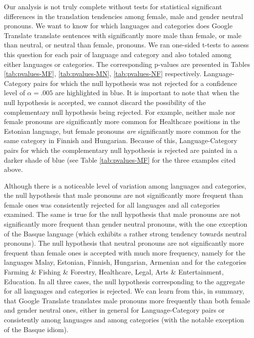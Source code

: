 \documentclass[twoside,11pt]{article}
\begin{document}
Our analysis is not truly complete without tests for statistical significant differences in the translation tendencies among female, male and gender neutral pronouns. We want to know for which languages and categories does Google Translate translate sentences with significantly more male than female, or male than neutral, or neutral than female, pronouns. We ran one-sided t-tests to assess this question for each pair of language and category and also totaled among either languages or categories. The corresponding p-values are presented in Tables \ref{tab:pvalues-MF}, \ref{tab:pvalues-MN}, \ref{tab:pvalues-NF} respectively. Language-Category pairs for which the null hypothesis was not rejected for a confidence level of $\alpha = .005$ are highlighted in blue. It is important to note that when the null hypothesis is accepted, we cannot discard the possibility of the complementary null hypothesis being rejected. For example, neither male nor female pronouns are significantly more common for Healthcare positions in the Estonian language, but female pronouns \emph{are} significantly more common for the same category in Finnish and Hungarian. Because of this, Language-Category pairs for which the complementary null hypothesis is rejected are painted in a darker shade of blue (see Table \ref{tab:pvalues-MF} for the three examples cited above.

Although there is a noticeable level of variation among languages and categories, the null hypothesis that male pronouns are not significantly more frequent than female ones was consistently rejected for all languages and all categories examined. The same is true for the null hypothesis that male pronouns are not significantly more frequent than gender neutral pronouns, with the one exception of the Basque language (which exhibits a rather strong tendency towards neutral pronouns). The null hypothesis that neutral pronouns are not significantly more frequent than female ones is accepted with much more frequency, namely for the languages Malay, Estonian, Finnish, Hungarian, Armenian and for the categories Farming \& Fishing \& Forestry, Healthcare, Legal, Arts \& Entertainment, Education. In all three cases, the null hypothesis corresponding to the aggregate for all languages and categories is rejected. We can learn from this, in summary, that Google Translate translates male pronouns more frequently than both female and gender neutral ones, either in general for Language-Category pairs or consistently among languages and among categories (with the notable exception of the Basque idiom).
\end{document}
